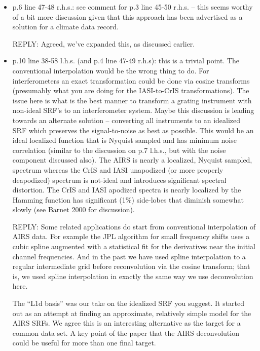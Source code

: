 \documentclass[11pt]{article}
\newcommand {\reply} {\mbox{\small REPLY}}
\begin{document}
\begin{itemize}

\item p.6 line 47-48 r.h.s.: see comment for p.3 line 45-50 r.h.s. –
  this seems worthy of a bit more discussion given that this
  approach has been advertised as a solution for a climate data
  record.

  \reply: Agreed, we've expanded this, as discussed earlier.

\item p.10 line 38-58 l.h.s. (and p.4 line 47-49 r.h.s): this is a
  trivial point. The conventional interpolation would be the wrong
  thing to do. For interferometers an exact transformation could be
  done via cosine transforms (presumably what you are doing for the
  IASI-to-CrIS transformations). The issue here is what is the best
  manner to transform a grating instrument with non-ideal SRF’s to
  an interferometer system. Maybe this discussion is leading towards
  an alternate solution – converting all instruments to an idealized
  SRF which preserves the signal-to-noise as best as possible. This
  would be an ideal localized function that is Nyquist sampled and
  has minimum noise correlation (similar to the discussion on p.7
  l.h.s., but with the noise component discussed also). The AIRS is
  nearly a localized, Nyquist sampled, spectrum whereas the CrIS and
  IASI unapodized (or more properly deapodized) spectrum is
  not-ideal and introduces significant spectral distortion. The CrIS
  and IASI apodized spectra is nearly localized by the Hamming
  function has significant (1\%) side-lobes that diminish somewhat
  slowly (see Barnet 2000 for discussion).

  \reply: Some related applications do start from conventional
  interpolation of AIRS data.  For example the JPL algorithm for
  small frequency shifts uses a cubic spline augmented with a
  statistical fit for the derivatives near the initial channel
  frequencies.  And in the past we have used spline interpolation to
  a regular intermediate grid before reconvolution via the cosine
  transform; that is, we used spline interpolation in exactly the
  same way we use deconvolution here.
  
  The ``L1d basis'' was our take on the idealized SRF you suggest.
  It started out as an attempt at finding an approximate, relatively
  simple model for the AIRS SRFs.  We agree this is an interesting
  alternative as the target for a common data set.  A key point of
  the paper that the AIRS deconvolution could be useful for more
  than one final target.


\end{itemize}
\end{document}

